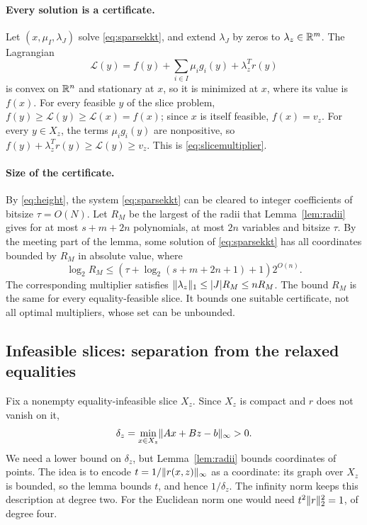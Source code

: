 \paragraph{Every solution is a certificate.}
Let $(x,\mu_I,\lambda_J)$ solve \eqref{eq:sparsekkt}, and extend
$\lambda_J$ by zeros to $\lambda_z\in\mathbb R^m$. The Lagrangian
\[
 \mathcal L(y)=f(y)+\sum_{i\in I}\mu_ig_i(y)+\lambda_z^Tr(y)
\]
is convex on $\mathbb R^n$ and stationary at $x$, so it is minimized at $x$,
where its value is $f(x)$. For every feasible $y$ of the slice problem,
$f(y)\ge\mathcal L(y)\ge\mathcal L(x)=f(x)$; since $x$ is itself feasible,
$f(x)=v_z$. For every $y\in X_z$, the terms $\mu_ig_i(y)$ are
nonpositive, so
$f(y)+\lambda_z^Tr(y)\ge\mathcal L(y)\ge v_z$. This is
\eqref{eq:slicemultiplier}.

\paragraph{Size of the certificate.}
By \eqref{eq:height}, the system \eqref{eq:sparsekkt} can be cleared to
integer coefficients of bitsize $\tau=O(N)$. Let $R_M$ be the largest of
the radii that Lemma~\ref{lem:radii} gives for at most $s+m+2n$
polynomials, at most $2n$ variables and bitsize $\tau$. By the meeting
part of the lemma, some solution of \eqref{eq:sparsekkt} has all
coordinates bounded by $R_M$ in absolute value, where
\begin{equation}\label{eq:RM}
 \log_2 R_M\le (\tau+\log_2(s+m+2n+1)+1)2^{O(n)}.
\end{equation}
The corresponding multiplier satisfies
$\lVert\lambda_z\rVert_1\le|J|R_M\le nR_M$. The bound $R_M$ is the same for
every equality-feasible slice. It bounds one suitable certificate, not
all optimal multipliers, whose set can be unbounded.

\subsection{Infeasible slices: separation from the relaxed equalities}
\label{sec:upper-infeasible}
Fix a nonempty equality-infeasible slice $X_z$. Since $X_z$ is compact
and $r$ does not vanish on it,
\[
 \delta_z=\min_{x\in X_z}\lVert Ax+Bz-b\rVert_\infty>0.
\]
We need a lower bound on $\delta_z$, but Lemma~\ref{lem:radii} bounds
coordinates of points. The idea is to encode $t=1/\lVert r(x,z)\rVert_\infty$
as a coordinate: its graph over $X_z$ is bounded, so the lemma bounds
$t$, and hence $1/\delta_z$. The infinity norm keeps this description at
degree two. For the Euclidean norm one would need
$t^2\lVert r\rVert_2^2=1$, of degree four.

